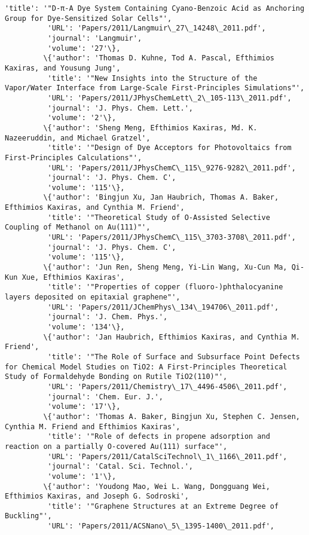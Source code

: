 \documentclass[11pt]{article}
\begin{document}
\begin{Verbatim}[commandchars=\\\{\}]
          'title': '"D-π-A Dye System Containing Cyano-Benzoic Acid as Anchoring Group for Dye-Sensitized Solar Cells"',
          'URL': 'Papers/2011/Langmuir\_27\_14248\_2011.pdf',
          'journal': 'Langmuir',
          'volume': '27'\},
         \{'author': 'Thomas D. Kuhne, Tod A. Pascal, Efthimios Kaxiras, and Yousung Jung',
          'title': '"New Insights into the Structure of the Vapor/Water Interface from Large-Scale First-Principles Simulations"',
          'URL': 'Papers/2011/JPhysChemLett\_2\_105-113\_2011.pdf',
          'journal': 'J. Phys. Chem. Lett.',
          'volume': '2'\},
         \{'author': 'Sheng Meng, Efthimios Kaxiras, Md. K. Nazeeruddin, and Michael Gratzel',
          'title': '"Design of Dye Acceptors for Photovoltaics from First-Principles Calculations"',
          'URL': 'Papers/2011/JPhysChemC\_115\_9276-9282\_2011.pdf',
          'journal': 'J. Phys. Chem. C',
          'volume': '115'\},
         \{'author': 'Bingjun Xu, Jan Haubrich, Thomas A. Baker, Efthimios Kaxiras, and Cynthia M. Friend',
          'title': '"Theoretical Study of O-Assisted Selective Coupling of Methanol on Au(111)"',
          'URL': 'Papers/2011/JPhysChemC\_115\_3703-3708\_2011.pdf',
          'journal': 'J. Phys. Chem. C',
          'volume': '115'\},
         \{'author': 'Jun Ren, Sheng Meng, Yi-Lin Wang, Xu-Cun Ma, Qi-Kun Xue, Efthimios Kaxiras',
          'title': '"Properties of copper (fluoro-)phthalocyanine layers deposited on epitaxial graphene"',
          'URL': 'Papers/2011/JChemPhys\_134\_194706\_2011.pdf',
          'journal': 'J. Chem. Phys.',
          'volume': '134'\},
         \{'author': 'Jan Haubrich, Efthimios Kaxiras, and Cynthia M. Friend',
          'title': '"The Role of Surface and Subsurface Point Defects for Chemical Model Studies on TiO2: A First-Principles Theoretical Study of Formaldehyde Bonding on Rutile TiO2(110)"',
          'URL': 'Papers/2011/Chemistry\_17\_4496-4506\_2011.pdf',
          'journal': 'Chem. Eur. J.',
          'volume': '17'\},
         \{'author': 'Thomas A. Baker, Bingjun Xu, Stephen C. Jensen, Cynthia M. Friend and Efthimios Kaxiras',
          'title': '"Role of defects in propene adsorption and reaction on a partially O-covered Au(111) surface"',
          'URL': 'Papers/2011/CatalSciTechnol\_1\_1166\_2011.pdf',
          'journal': 'Catal. Sci. Technol.',
          'volume': '1'\},
         \{'author': 'Youdong Mao, Wei L. Wang, Dongguang Wei, Efthimios Kaxiras, and Joseph G. Sodroski',
          'title': '"Graphene Structures at an Extreme Degree of Buckling"',
          'URL': 'Papers/2011/ACSNano\_5\_1395-1400\_2011.pdf',

\end{Verbatim}
\end{document}
